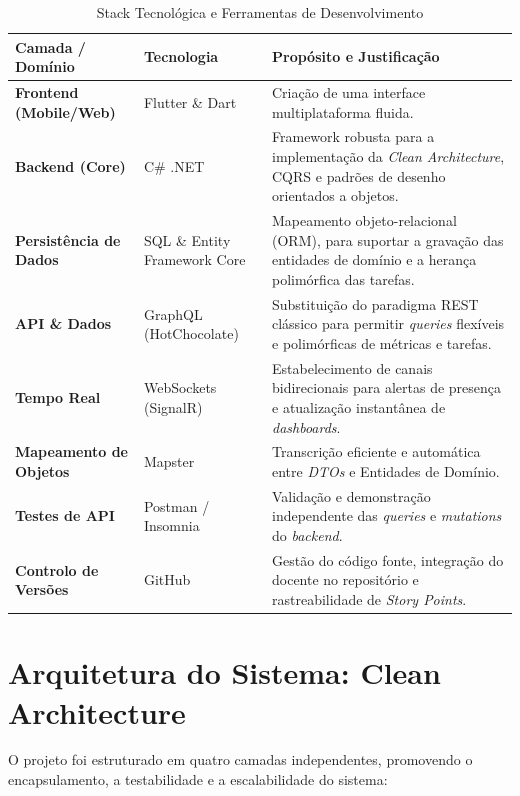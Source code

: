 \documentclass{llncs}
\begin{document}
\begin{table}[H]
\caption{Stack Tecnológica e Ferramentas de Desenvolvimento}
\label{tab:tech_stack}
\centering
\renewcommand{\arraystretch}{1.4}
\begin{tabular}{>{\raggedright\arraybackslash}p{3cm} >{\raggedright\arraybackslash}p{4cm} >{\raggedright\arraybackslash}p{5cm}}
\toprule
\textbf{Camada / Domínio} & \textbf{Tecnologia} & \textbf{Propósito e Justificação} \\
\midrule
\textbf{Frontend (Mobile/Web)} & Flutter \& Dart & Criação de uma interface multiplataforma fluida.\\
\textbf{Backend (Core)} & C\# .NET & Framework robusta para a implementação da \textit{Clean Architecture}, CQRS e padrões de desenho orientados a objetos. \\
\textbf{Persistência de Dados} & SQL \& Entity Framework Core & Mapeamento objeto-relacional (ORM), para suportar a gravação das entidades de domínio e a herança polimórfica das tarefas. \\
\textbf{API \& Dados} & GraphQL (HotChocolate) & Substituição do paradigma REST clássico para permitir \textit{queries} flexíveis e polimórficas de métricas e tarefas. \\
\textbf{Tempo Real} & WebSockets (SignalR) & Estabelecimento de canais bidirecionais para alertas de presença e atualização instantânea de \textit{dashboards}. \\
\textbf{Mapeamento de Objetos} & Mapster & Transcrição eficiente e automática entre \textit{DTOs} e Entidades de Domínio. \\
\textbf{Testes de API} & Postman / Insomnia & Validação e demonstração independente das \textit{queries} e \textit{mutations} do \textit{backend}. \\
\textbf{Controlo de Versões} & GitHub & Gestão do código fonte, integração do docente no repositório e rastreabilidade de \textit{Story Points}. \\
\bottomrule
\end{tabular}
\end{table}

\newpage

\section{Arquitetura do Sistema: Clean Architecture}
O projeto foi estruturado em quatro camadas independentes, promovendo o encapsulamento, a testabilidade e a escalabilidade do sistema:
\end{document}
